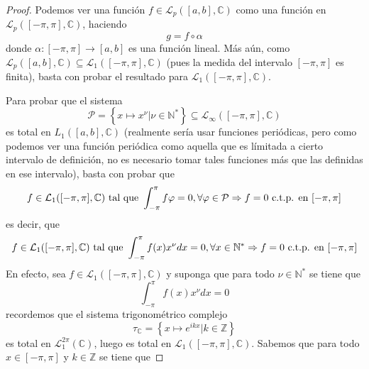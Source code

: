 \documentclass[12pt]{report}
\newcounter{it}
\theoremstyle{largebreak}
\newcommand\cf[3]{\ensuremath{#1:#2\rightarrow#3}}
\begin{document}
    \begin{proof}
        Podemos ver una función $f\in\mathcal{L}_p([a,b],\mathbb{C})$ como una función en $\mathcal{L}_p([-\pi,\pi],\mathbb{C})$, haciendo
        \begin{equation*}
            g=f\circ \alpha
        \end{equation*}
        donde $\cf{\alpha}{[-\pi,\pi]}{[a,b]}$ es una función lineal. Más aún, como $\mathcal{L}_p([a,b],\mathbb{C})\subseteq\mathcal{L}_1([-\pi,\pi],\mathbb{C})$ (pues la medida del intervalo $[-\pi,\pi]$ es finita), basta con probar el resultado para $\mathcal{L}_1([-\pi,\pi],\mathbb{C})$.

        Para probar que el sistema
        \begin{equation*}
            \mathcal{P}=\left\{x\mapsto x^\nu\Big|\nu\in\mathbb{N}^* \right\}\subseteq \mathcal{L}_{ \infty}([-\pi,\pi],\mathbb{C})
        \end{equation*}
        es total en $L_1([a,b],\mathbb{C})$ (realmente sería usar funciones periódicas, pero como podemos ver una función periódica como aquella que es límitada a cierto intervalo de definición, no es necesario tomar tales funciones más que las definidas en ese intervalo), basta con probar que
        \begin{equation*}
            f\in\mathcal{L}_1([-\pi,\pi],\mathbb{C})\textup{ tal que }\int_{ -\pi}^\pi f\varphi=0,\forall \varphi\in\mathcal{P}\Rightarrow f=0\textup{ c.t.p. en }[-\pi,\pi]
        \end{equation*}
        es decir, que
        \begin{equation*}
            f\in\mathcal{L}_1([-\pi,\pi],\mathbb{C})\textup{ tal que }\int_{ -\pi}^\pi f(x)x^\nu dx=0,\forall x\in\mathbb{N}^* \Rightarrow f=0\textup{ c.t.p. en }[-\pi,\pi]
        \end{equation*}
        En efecto, sea $f\in\mathcal{L}_1([-\pi,\pi],\mathbb{C})$ y suponga que para todo $\nu\in\mathbb{N}^*$ se tiene que
        \begin{equation*}
            \int_{ -\pi}^\pi f(x)x^\nu dx=0
        \end{equation*}
        recordemos que el sistema trigonométrico complejo
        \begin{equation*}
            \tau_{\mathbb{C}}=\left\{x\mapsto e^{ ikx}\Big|k\in\mathbb{Z} \right\}
        \end{equation*}
        es total en $\mathcal{L}_1^{2\pi}(\mathbb{C})$, luego es total en $\mathcal{L}_1([-\pi,\pi],\mathbb{C})$. Sabemos que para todo $x\in[-\pi,\pi]$ y $k\in\mathbb{Z}$ se tiene que

\end{proof}
\end{document}
